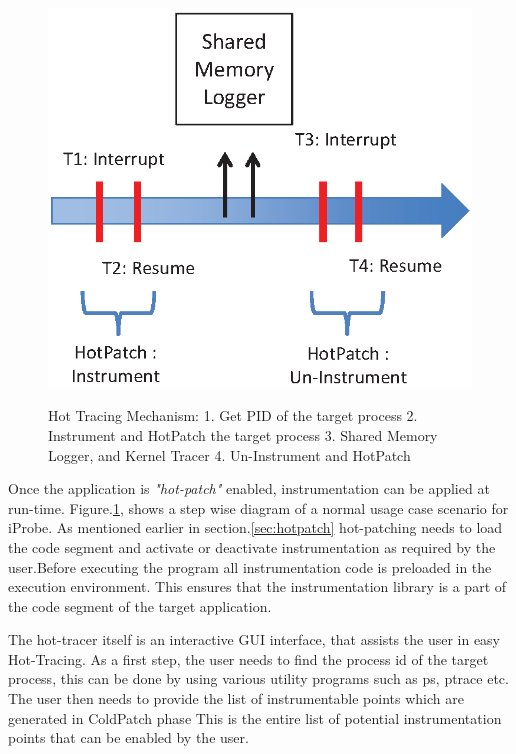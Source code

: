 \begin{figure}[htb]
\begin{center}
  \includegraphics[scale=0.85]{Images/HotTracing.eps}
  \label{fig:hottracing}
  \caption{Hot Tracing Mechanism: 1. Get PID of the target process 2. Instrument and HotPatch the target process 
  3. Shared Memory Logger, and Kernel Tracer 4. Un-Instrument and HotPatch}
\end{center}
\end{figure}


Once the application is \textit{"hot-patch"} enabled, instrumentation can be applied at run-time. Figure.\ref{fig:hottracing}, shows a step wise diagram of a normal usage case scenario for iProbe. As mentioned earlier in section.\ref{sec:hotpatch} hot-patching needs to load the code segment and activate or deactivate instrumentation as required by the user.Before executing the program all instrumentation code is preloaded in the execution environment. This ensures that the instrumentation library is a part of the code segment of the target application.

The hot-tracer itself is an interactive GUI interface, that assists the user in easy Hot-Tracing. As a first step, the user needs to find the process id of the target process, this can be done by using various utility programs such as ps, ptrace etc. The user then needs to provide the list of instrumentable points which are generated in ColdPatch phase This is the entire list of potential instrumentation points that can be enabled by the user. 

